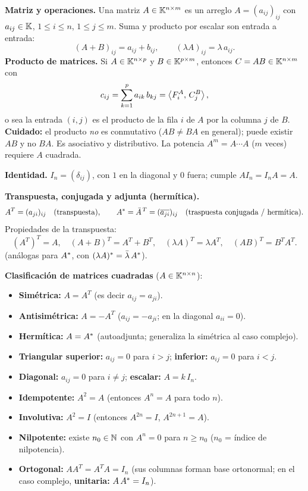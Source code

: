 \begin{teoria}
\textbf{Matriz y operaciones.} Una matriz $A \in \mathbb{K}^{n\times m}$ es un arreglo $A = (a_{ij})_{ij}$ con $a_{ij} \in \mathbb{K}$, $1\le i\le n$, $1\le j\le m$. Suma y producto por escalar son entrada a entrada:
\[
(A+B)_{ij} = a_{ij} + b_{ij}, \qquad (\lambda A)_{ij} = \lambda\,a_{ij}.
\]
\textbf{Producto de matrices.} Si $A \in \mathbb{K}^{n\times p}$ y $B \in \mathbb{K}^{p\times m}$, entonces $C = AB \in \mathbb{K}^{n\times m}$ con
\[
c_{ij} = \sum_{k=1}^{p} a_{ik}\,b_{kj} = \left\langle F_i^A,\, C_j^B \right\rangle,
\]
o sea la entrada $(i,j)$ es el producto de la fila $i$ de $A$ por la columna $j$ de $B$. \textbf{Cuidado:} el producto \emph{no} es conmutativo ($AB \neq BA$ en general); puede existir $AB$ y no $BA$. Es asociativo y distributivo. La potencia $A^m = A\cdots A$ ($m$ veces) requiere $A$ cuadrada.

\medskip
\textbf{Identidad.} $I_n = (\delta_{ij})$, con $1$ en la diagonal y $0$ fuera; cumple $AI_n = I_n A = A$.
\end{teoria}

\begin{teoria}
\textbf{Transpuesta, conjugada y adjunta (hermítica).}
\[
A^T = (a_{ji})_{ij} \quad (\text{transpuesta}), \qquad
A^{*} = \bar A^{\,T} = (\overline{a_{ji}})_{ij} \quad (\text{traspuesta conjugada / hermítica}).
\]
Propiedades de la transpuesta:
\[
(A^T)^T = A, \quad (A+B)^T = A^T + B^T, \quad (\lambda A)^T = \lambda A^T, \quad (AB)^T = B^T A^T.
\]
(análogas para $A^{*}$, con $(\lambda A)^{*} = \bar\lambda\,A^{*}$).
\end{teoria}

\begin{teoria}
\textbf{Clasificación de matrices cuadradas} ($A \in \mathbb{K}^{n\times n}$):
\begin{itemize}
  \item \textbf{Simétrica:} $A = A^T$ (es decir $a_{ij} = a_{ji}$).
  \item \textbf{Antisimétrica:} $A = -A^T$ ($a_{ij} = -a_{ji}$; en la diagonal $a_{ii}=0$).
  \item \textbf{Hermítica:} $A = A^{*}$ (autoadjunta; generaliza la simétrica al caso complejo).
  \item \textbf{Triangular superior:} $a_{ij}=0$ para $i>j$; \textbf{inferior:} $a_{ij}=0$ para $i<j$.
  \item \textbf{Diagonal:} $a_{ij}=0$ para $i\neq j$; \textbf{escalar:} $A = k\,I_n$.
  \item \textbf{Idempotente:} $A^2 = A$ (entonces $A^n = A$ para todo $n$).
  \item \textbf{Involutiva:} $A^2 = I$ (entonces $A^{2n}=I$, $A^{2n+1}=A$).
  \item \textbf{Nilpotente:} existe $n_0 \in \mathbb{N}$ con $A^{n} = 0$ para $n \ge n_0$ ($n_0$ = índice de nilpotencia).
  \item \textbf{Ortogonal:} $A A^T = A^T A = I_n$ (sus columnas forman base ortonormal; en el caso complejo, \textbf{unitaria:} $A\,A^{*} = I_n$).
\end{itemize}
\end{teoria}

